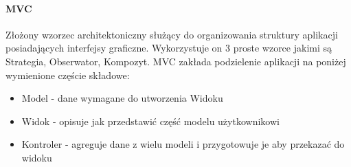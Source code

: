 \documentclass[10pt,titlepage]{article}
\begin{document}
\paragraph{MVC}
Złożony wzorzec architektoniczny służący do organizowania struktury aplikacji posiadających interfejsy graficzne. Wykorzystuje on 3 proste wzorce jakimi są Strategia, Obserwator, Kompozyt.\linebreak
MVC zakłada podzielenie aplikacji na poniżej wymienione częście składowe:
\begin{itemize}
  \item Model - dane wymagane do utworzenia Widoku
  \item Widok - opisuje jak przedstawić część modelu użytkownikowi
  \item Kontroler - agreguje dane z wielu modeli i przygotowuje je aby przekazać do widoku
\end{itemize}
\end{document}
